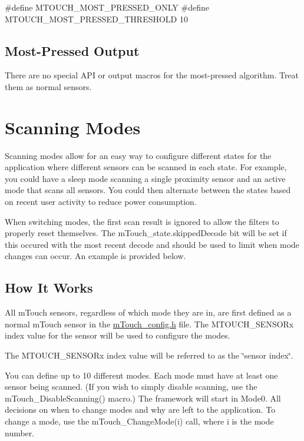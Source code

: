 \begin{DoxyCode}
\textcolor{preprocessor}{#define MTOUCH\_MOST\_PRESSED\_ONLY}
\textcolor{preprocessor}{#define MTOUCH\_MOST\_PRESSED\_THRESHOLD   10}
\end{DoxyCode}
\hypertarget{feat_most_pressed_featMostPressed-Out}{}\subsection{Most-\/\+Pressed Output}\label{feat_most_pressed_featMostPressed-Out}
There are no special A\+P\+I or output macros for the most-\/pressed algorithm. Treat them as normal sensors. \hypertarget{featMode}{}\section{Scanning Modes}\label{featMode}
Scanning modes allow for an easy way to configure different states for the application where different sensors can be scanned in each state. For example, you could have a \textquotesingle{}sleep\textquotesingle{} mode scanning a single proximity sensor and an \textquotesingle{}active\textquotesingle{} mode that scans all sensors. You could then alternate between the states based on recent user activity to reduce power consumption.

When switching modes, the first scan result is ignored to allow the filters to properly reset themselves. The m\+Touch\+\_\+state.\+skipped\+Decode bit will be set if this occured with the most recent decode and should be used to limit when mode changes can occur. An example is provided below.\hypertarget{feat_mode_featMode-How}{}\subsection{How It Works}\label{feat_mode_featMode-How}
All m\+Touch sensors, regardless of which mode they are in, are first defined as a normal m\+Touch sensor in the \hyperlink{m_touch__config_8h}{m\+Touch\+\_\+config.\+h} file. The M\+T\+O\+U\+C\+H\+\_\+\+S\+E\+N\+S\+O\+Rx index value for the sensor will be used to configure the modes.

The M\+T\+O\+U\+C\+H\+\_\+\+S\+E\+N\+S\+O\+Rx index value will be referred to as the \char`\"{}sensor index\char`\"{}.

You can define up to 10 different modes. Each mode must have at least one sensor being scanned. (If you wish to simply disable scanning, use the m\+Touch\+\_\+\+Disable\+Scanning() macro.) The framework will start in Mode0. All decisions on when to change modes and why are left to the application. To change a mode, use the m\+Touch\+\_\+\+Change\+Mode(i) call, where i is the mode number.

